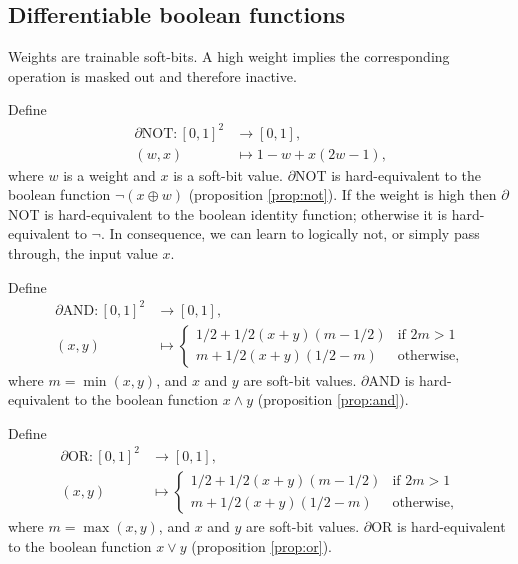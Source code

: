 \documentclass{article} %
\begin{document}
\subsection{Differentiable boolean functions}

Weights are trainable soft-bits. A high weight implies the corresponding operation is masked out and therefore inactive.

Define
	\begin{equation*}
	\begin{aligned}
	\partial\text{NOT}: [0, 1]^{2} &\to [0,1], \\
	(w, x) &\mapsto 1 - w + x (2w - 1)\text{,}
	\end{aligned}
	\end{equation*}
where $w$ is a weight and $x$ is a soft-bit value.
$\partial${NOT} is hard-equivalent to the boolean function $\neg(x \oplus w)$ (proposition \ref{prop:not}). If the weight is high then $\partial${NOT} is hard-equivalent to the boolean identity function; otherwise it is hard-equivalent to $\neg$. In consequence, we can learn to logically not, or simply pass through, the input value $x$.

Define
\begin{equation*}
\begin{aligned}
\partial\text{AND}: [0,1]^{2} &\to [0,1], \\
	(x, y) &\mapsto 
	\begin{cases}
	1/2 + 1/2(x + y)(m - 1/2) & \text{if } 2m > 1 \\
	m + 1/2(x + y)(1/2 - m) & \text{otherwise,}
	\end{cases}
\end{aligned}
\end{equation*}
where $m=\min(x,y)$, and $x$ and $y$ are soft-bit values.
$\partial${AND} is hard-equivalent to the boolean function $x \wedge y$ (proposition \ref{prop:and}).

Define 
\begin{equation*}
\begin{aligned}
\partial\text{OR}: [0,1]^{2} &\to [0,1], \\
(x, y) &\mapsto 
\begin{cases}
	1/2 + 1/2(x + y)(m - 1/2) & \text{if } 2m > 1 \\
m + 1/2(x + y)(1/2 - m) & \text{otherwise,}
\end{cases}
\end{aligned}
\end{equation*}
where $m=\max(x,y)$, and $x$ and $y$ are soft-bit values.
$\partial${OR} is hard-equivalent to the boolean function $x \vee y$ (proposition \ref{prop:or}).
\end{document}
